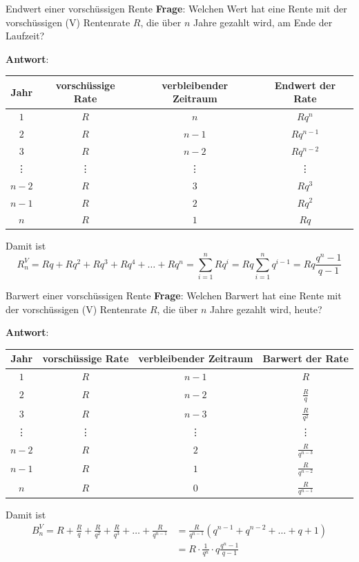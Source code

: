 \begin{frame}{Endwert einer vorschüssigen Rente}
	\textbf{Frage}: Welchen Wert hat eine Rente mit der vorschüssigen (V) Rentenrate $R$, die über $n$ Jahre gezahlt wird, am Ende der Laufzeit?
	
	\footnotesize{
		\textbf{Antwort}: \begin{tabular}{|c|c|c|c|}
			\hline Jahr & vorschüssige Rate & verbleibender Zeitraum & Endwert der Rate \\ 
			\hline $1$ & $R$ & $n$ & $Rq^{n}$ \\ 
			\hline $2$ & $R$ & $n-1$ & $Rq^{n-1}$ \\ 
			\hline $3$ & $R$ & $n-2$ & $Rq^{n-2}$ \\ 
			\hline \vdots & \vdots & \vdots & \vdots \\ 
			\hline $n-2$ & $R$ & $3$ & $Rq^{3}$ \\ 
			\hline $n-1$ & $R$ & $2$ & $Rq^{2}$ \\ 
			\hline $n$ & $R$ & $1$ & $Rq$ \\ 
			\hline 
		\end{tabular}
		
		Damit ist
		\[
		R_{n}^{V} = Rq + Rq^{2} + Rq^{3} + R q^{4} + \ldots + Rq^{n} = \sum\limits_{i=1}^{n} Rq^{i} = Rq \sum\limits_{i=1}^{n} q^{i-1} = Rq \frac{q^{n}-1}{q-1}
		\] }
\end{frame}

\begin{frame}{Barwert einer vorschüssigen Rente}
	\textbf{Frage}: Welchen Barwert hat eine Rente mit der vorschüssigen (V) Rentenrate $R$, die über $n$ Jahre gezahlt wird, heute?
	
	\footnotesize{
		\textbf{Antwort}: \begin{tabular}{|c|c|c|c|}
			\hline Jahr & vorschüssige Rate & verbleibender Zeitraum & Barwert der Rate \\ 
			\hline $1$ & $R$ & $n-1$ & $R$ \\ 
			\hline $2$ & $R$ & $n-2$ & $\frac{R}{q}$ \\ 
			\hline $3$ & $R$ & $n-3$ & $\frac{R}{q^{2}}$ \\ 
			\hline \vdots & \vdots & \vdots & \vdots \\ 
			\hline $n-2$ & $R$ & $2$ & $\frac{R}{q^{n-3}}$ \\ 
			\hline $n-1$ & $R$ & $1$ & $\frac{R}{q^{n-2}}$ \\ 
			\hline $n$ & $R$ & $0$ & $\frac{R}{q^{n-1}}$ \\ 
			\hline 
		\end{tabular}
		
		Damit ist
		\begin{align*}
		B_{n}^{V} = R + \frac{R}{q} + \frac{R}{q^{2}} + \frac{R}{q^{3}} + \ldots + \frac{R}{q^{n-1}} & = \frac{R}{q^{n-1}} \left( q^{n-1} + q^{n-2} + \ldots + q + 1 \right) \\  & = R \cdot \frac{1}{q^{n}} \cdot q \frac{q^{n}-1}{q-1}
		\end{align*}}
\end{frame}

